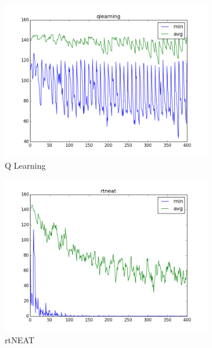 \documentclass[letterpaper]{article}
\begin{document}
\begin{figure}[ht]
\centering
\begin{subfigure}{0.7\columnwidth}
  \centering
  \includegraphics[width=\columnwidth]{flag_qlearning.png}
  \caption{Q Learning}
  \label{fig:flag_q}
\end{subfigure}%
\begin{subfigure}{0.7\columnwidth}
  \centering
  \includegraphics[width=\columnwidth]{flag_rtneat.png}
  \caption{rtNEAT}
  \label{fig:flag_neat}
\end{subfigure}
\begin{subfigure}{0.7\columnwidth}
  \centering

\end{subfigure}
\end{figure}
\end{document}
